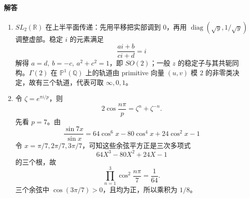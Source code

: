 \documentclass[UTF8,12pt]{ctexart}
\begin{document}
\paragraph{解答}
\begin{enumerate}[label=\textbf{\arabic*.},leftmargin=2.2em]
\item \(SL_2(\mathbb R)\) 在上半平面传递：先用平移把实部调到 \(0\)，再用 \(\operatorname{diag}(\sqrt y,1/\sqrt y)\) 调整虚部。稳定 \(i\) 的元素满足
\[
\frac{ai+b}{ci+d}=i
\]
解得 \(a=d,\ b=-c,\ a^2+c^2=1\)，即 \(SO(2)\)；一般 \(z\) 的稳定子与其共轭同构。\(\Gamma(2)\) 在 \(\mathbb P^1(\mathbb Q)\) 上的轨道由 primitive 向量 \((u,v)\) 模 \(2\) 的非零类决定，故有三个轨道，代表可取 \(\infty,0,1\)。
\item 令 \(\zeta=e^{\pi i/p}\)，则
\[
2\cos\frac{n\pi}{p}=\zeta^n+\zeta^{-n}.
\]
先看 \(p=7\)。由
\[
\frac{\sin 7x}{\sin x}=64\cos^6x-80\cos^4x+24\cos^2x-1
\]
令 \(x=\pi/7,2\pi/7,3\pi/7\)，可知这些余弦平方正是三次多项式
\[
64X^3-80X^2+24X-1
\]
的三个根，故
\[
\prod_{n=1}^{3}\cos^2\frac{n\pi}{7}=\frac1{64}.
\]
三个余弦中 \(\cos(3\pi/7)>0\)，且均为正，所以乘积为 \(1/8\)。


\end{enumerate}
\end{document}
